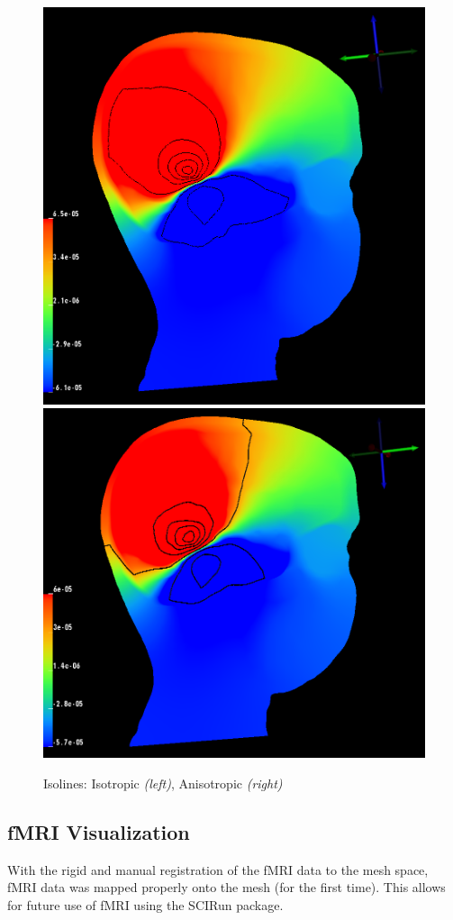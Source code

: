 \begin{figure}[H]
\begin{center}
\includegraphics[width=.49\textwidth]{Figures/iso_isolines}
\includegraphics[width=.49\textwidth]{Figures/aniso_isolines}
\caption{Isolines: Isotropic \textit{(left)}, Anisotropic \textit{(right)}}
\label{fig:isolines}
\end{center}
\end{figure}

\subsection{fMRI Visualization}

With the rigid and manual registration of the fMRI data to the mesh space, fMRI data was mapped properly onto the mesh (for the first time). This allows for future use of fMRI using the SCIRun package.


